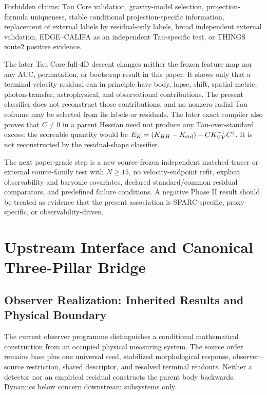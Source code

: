 \documentclass[11pt]{article}
\begin{document}
Forbidden claims: Tau Core validation, gravity-model selection, projection-formula uniqueness, stable conditional projection-specific information, replacement of external labels by residual-only labels, broad independent external validation, EDGE--CALIFA as an independent Tau-specific test, or THINGS route2 positive evidence.

The later Tau Core full-4D descent changes neither the frozen feature map nor any AUC, permutation, or bootstrap result in this paper.  It shows only that a terminal velocity residual can in principle have body, lapse, shift, spatial-metric, photon-transfer, astrophysical, and observational contributions.  The present classifier does not reconstruct those contributions, and no nonzero radial Tau coframe may be selected from its labels or residuals.  The later exact compiler also proves that $C\neq0$ in a parent Hessian need not produce any Tau-over-standard excess: the scoreable quantity would be $E_K=(K_{HH}-K_{\rm std})-CK_{VV}^{-1}C^\dagger$.  It is not reconstructed by the residual-shape classifier.

The next paper-grade step is a new source-frozen independent matched-tracer or external source-family test with $N\geq15$, no velocity-endpoint refit, explicit observability and baryonic covariates, declared standard/common residual comparators, and predefined failure conditions. A negative Phase II result should be treated as evidence that the present association is SPARC-specific, proxy-specific, or observability-driven.

\section{Upstream Interface and Canonical Three-Pillar Bridge}
\label{sec:upstream-interface}

\subsection{Observer Realization: Inherited Results and Physical Boundary}
\label{sec:observer-update-20260914}
The current observer programme distinguishes a conditional mathematical
construction from an occupied physical measuring system. The source order
remains base plus one universal seed, stabilized morphological response,
observer--source restriction, shared descriptor, and resolved terminal
readouts. Neither a detector nor an empirical residual constructs the parent
body backwards. Dynamics below concern downstream subsystems only.
\end{document}
